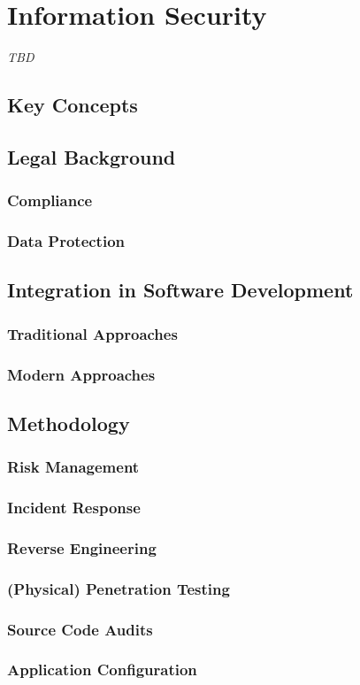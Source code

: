 \section{Information Security}
\label{sec:information-security}
\emph{TBD} %
\subsection{Key Concepts} %
\subsection{Legal Background} %
\subsubsection{Compliance}
\subsubsection{Data Protection}
\subsection{Integration in Software Development}
\subsubsection{Traditional Approaches}
\subsubsection{Modern Approaches}
\subsection{Methodology}
\subsubsection{Risk Management}
\subsubsection{Incident Response}
\subsubsection{Reverse Engineering} %
\subsubsection{(Physical) Penetration Testing} %
\subsubsection{Source Code Audits}
\subsubsection{Application Configuration}